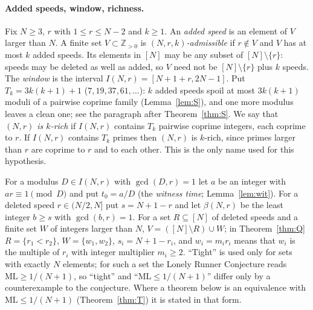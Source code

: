 \documentclass[11pt]{article}
\theoremstyle{definition}
\theoremstyle{remark}
\newcommand{\ML}{\mathrm{ML}}
\newcommand{\ZZ}{\mathbb{Z}}
\begin{document}
\paragraph{Added speeds, window, richness.}
Fix $N\ge3$, $r$ with $1\le r\le N-2$ and $k\ge1$. An \emph{added speed} is an element of $V$ larger than $N$. A finite set $V\subset\ZZ_{>0}$ is \emph{$(N,r,k)$-admissible} if $r\notin V$ and $V$ has at most $k$ added speeds. Its elements in $[N]$ may be any subset of $[N]\setminus\{r\}$: speeds may be deleted as well as added, so $V$ need not be $[N]\setminus\{r\}$ plus $k$ speeds. The \emph{window} is the interval $I(N,r)=[N+1+r,2N-1]$. Put $T_k=3k(k+1)+1$ ($7,19,37,61,\dots$): $k$ added speeds spoil at most $3k(k+1)$ moduli of a pairwise coprime family (Lemma~\ref{lem:S}), and one more modulus leaves a clean one; see the paragraph after Theorem~\ref{thm:S}. We say that \emph{$(N,r)$ is $k$-rich} if $I(N,r)$ contains $T_k$ pairwise coprime integers, each coprime to $r$. If $I(N,r)$ contains $T_k$ primes then $(N,r)$ is $k$-rich, since primes larger than $r$ are coprime to $r$ and to each other. This is the only name used for this hypothesis.

For a modulus $D\in I(N,r)$ with $\gcd(D,r)=1$ let $a$ be an integer with $ar\equiv1\pmod D$ and put $t_0=a/D$ (the \emph{witness time}; Lemma~\ref{lem:wit}). For a deleted speed $r\in(N/2,N]$ put $s=N+1-r$ and let $\beta(N,r)$ be the least integer $b\ge s$ with $\gcd(b,r)=1$. For a set $R\subseteq[N]$ of deleted speeds and a finite set $W$ of integers larger than $N$, $V=([N]\setminus R)\cup W$; in Theorem~\ref{thm:Q} $R=\{r_1<r_2\}$, $W=\{w_1,w_2\}$, $s_i=N+1-r_i$, and $w_i=m_ir_i$ means that $w_i$ is the multiple of $r_i$ with integer multiplier $m_i\ge2$. ``Tight'' is used only for sets with exactly $N$ elements; for such a set the Lonely Runner Conjecture reads $\ML\ge1/(N+1)$, so ``tight'' and ``$\ML\le1/(N+1)$'' differ only by a counterexample to the conjecture. Where a theorem below is an equivalence with $\ML\le1/(N+1)$ (Theorem~\ref{thm:T}) it is stated in that form.
\end{document}
